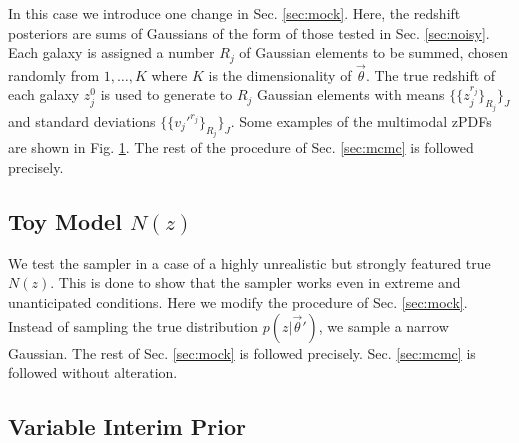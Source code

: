 \documentclass[preprint]{aastex}
\begin{document}
In this case we introduce one change in Sec. \ref{sec:mock}.  Here, the 
redshift posteriors are sums of Gaussians of the form of those tested in Sec. 
\ref{sec:noisy}.  Each galaxy is assigned a number $R_{j}$ of Gaussian elements 
to be summed, chosen randomly from $1,\dots,K$ where $K$ is the dimensionality 
of $\vec{\theta}$.  The true redshift of each galaxy $z_{j}^{0}$ is used to 
generate to $R_{j}$ Gaussian elements with means 
$\{\{z_{j}^{r_{j}}\}_{R_{j}}\}_{J}$ and standard deviations 
$\{\{v_{j}'^{r_{j}}\}_{R_{j}}\}_{J}$.  Some examples of the multimodal zPDFs 
are shown in Fig. \ref{fig:multipzs}.  The rest of the procedure of Sec. 
\ref{sec:mcmc} is followed precisely.

\begin{figure}
\caption{}
\label{fig:multipzs}
\end{figure}


\clearpage
\subsection{Toy Model $N(z)$}
\label{sec:fake}

We test the sampler in a case of a highly unrealistic but strongly featured 
true $N(z)$.  This is done to show that the sampler works even in extreme and 
unanticipated conditions.  Here we modify the procedure of Sec. \ref{sec:mock}. 
 Instead of sampling the true distribution $p(z|\vec{\theta}')$, we sample a 
narrow Gaussian.  The rest of Sec. \ref{sec:mock} is followed precisely.  Sec. 
\ref{sec:mcmc} is followed without alteration.

\begin{figure}
\caption{}
\label{fig:dumbestparam}
\end{figure}

\clearpage
\subsection{Variable Interim Prior}
\label{sec:interim}
\end{document}
